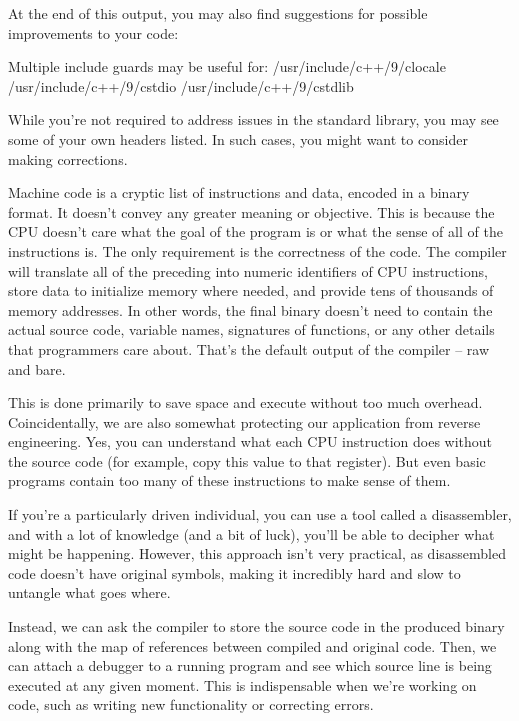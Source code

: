 At the end of this output, you may also find suggestions for possible improvements to your code:

\begin{shell}
Multiple include guards may be useful for:
/usr/include/c++/9/clocale
/usr/include/c++/9/cstdio
/usr/include/c++/9/cstdlib
\end{shell}

While you’re not required to address issues in the standard library, you may see some of your own headers listed. In such cases, you might want to consider making corrections.


Machine code is a cryptic list of instructions and data, encoded in a binary format. It doesn’t convey any greater meaning or objective. This is because the CPU doesn’t care what the goal of the program is or what the sense of all of the instructions is. The only requirement is the correctness of the code. The compiler will translate all of the preceding into numeric identifiers of CPU instructions, store data to initialize memory where needed, and provide tens of thousands of memory addresses. In other words, the final binary doesn’t need to contain the actual source code, variable names, signatures of functions, or any other details that programmers care about. That’s the default output of the compiler – raw and bare.

This is done primarily to save space and execute without too much overhead. Coincidentally, we are also somewhat protecting our application from reverse engineering. Yes, you can understand what each CPU instruction does without the source code (for example, copy this value to that register). But even basic programs contain too many of these instructions to make sense of them.

If you’re a particularly driven individual, you can use a tool called a disassembler, and with a lot of knowledge (and a bit of luck), you’ll be able to decipher what might be happening. However, this approach isn’t very practical, as disassembled code doesn’t have original symbols, making it incredibly hard and slow to untangle what goes where.

Instead, we can ask the compiler to store the source code in the produced binary along with the map of references between compiled and original code. Then, we can attach a debugger to a running program and see which source line is being executed at any given moment. This is indispensable when we’re working on code, such as writing new functionality or correcting errors.

